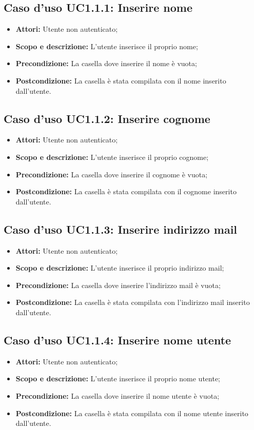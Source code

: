 \subsection{Caso d'uso UC1.1.1: Inserire nome}
\begin{itemize}
	\item \textbf{Attori:} Utente non autenticato;
	\item \textbf{Scopo e descrizione:} L'utente inserisce il proprio nome;
	\item \textbf{Precondizione:} La casella dove inserire il nome è vuota;
	\item \textbf{Postcondizione:} La casella è stata compilata con il nome inserito dall'utente.
\end{itemize}

\subsection{Caso d'uso UC1.1.2: Inserire cognome}
\begin{itemize}
	\item \textbf{Attori:} Utente non autenticato;
	\item \textbf{Scopo e descrizione:} L'utente inserisce il proprio cognome;
	\item \textbf{Precondizione:} La casella dove inserire il cognome è vuota;
	\item \textbf{Postcondizione:} La casella è stata compilata con il cognome inserito dall'utente.
\end{itemize}

\subsection{Caso d'uso UC1.1.3: Inserire indirizzo mail}
\begin{itemize}
	\item \textbf{Attori:} Utente non autenticato;
	\item \textbf{Scopo e descrizione:} L'utente inserisce il proprio indirizzo mail;
	\item \textbf{Precondizione:} La casella dove inserire l'indirizzo mail è vuota;
	\item \textbf{Postcondizione:} La casella è stata compilata con l'indirizzo mail inserito dall'utente.
\end{itemize}

\subsection{Caso d'uso UC1.1.4: Inserire nome utente}
\begin{itemize}
	\item \textbf{Attori:} Utente non autenticato;
	\item \textbf{Scopo e descrizione:} L'utente inserisce il proprio nome utente;
	\item \textbf{Precondizione:} La casella dove inserire il nome utente è vuota;
	\item \textbf{Postcondizione:} La casella è stata compilata con il nome utente inserito dall'utente.
\end{itemize}

